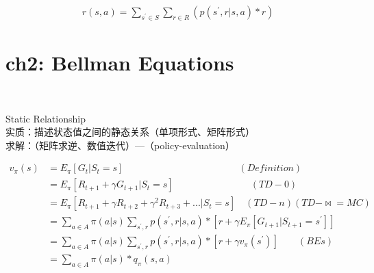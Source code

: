 \documentclass{article}
\begin{document}
\begin{align*}
    r(s, a) = \sum_{s^{\prime} \in S} \sum_{r \in R} 
    ( p ( s^{\prime}, r | s, a ) * r ) 
\end{align*}


\newpage
\section*{ch2: Bellman Equations}


~ \\[3pt]
\begin{CJK}{UTF8}{gbsn}
    Static Relationship \\[3pt]
    实质：描述状态值之间的静态关系（单项形式、矩阵形式） \\[3pt]
    求解：（矩阵求逆、数值迭代）---（policy-evaluation） \\[3pt]
\end{CJK}


\begin{align*}
    v_{\pi}(s) 
      &= E_{\pi} [ G_{t} | S_{t}=s ] 
         \qquad \qquad \qquad \qquad \qquad \qquad (Definition) \\[3pt]
      &= E_{\pi} [ R_{t+1} + \gamma G_{t+1} | S_{t}=s ] 
         \qquad \qquad \qquad \qquad (TD-0) \\[3pt]
      &= E_{\pi} [ R_{t+1} + \gamma R_{t+2} + \gamma^2 R_{t+3} + ... | S_{t}=s ] 
         \quad (TD-n)(TD-\Join = MC) \\[3pt]
      &= \sum_{a \in A} \pi(a | s) \sum_{s^{\prime}, r} 
         p ( s^{\prime}, r | s, a ) * 
         [ r + \gamma E_{\pi} [ G_{t+1} | S_{t+1}=s^{\prime} ] ] \\[3pt]
      &= \sum_{a \in A} \pi(a | s) \sum_{s^{\prime}, r} 
         p ( s^{\prime}, r | s, a ) * 
         [ r + \gamma v_{\pi} ( s^{\prime} ) ] \qquad (BEs) \\[3pt]
      &= \sum_{a \in A} \pi(a | s) * q_{\pi}(s, a) \\[3pt]
\end{align*}
\end{document}
